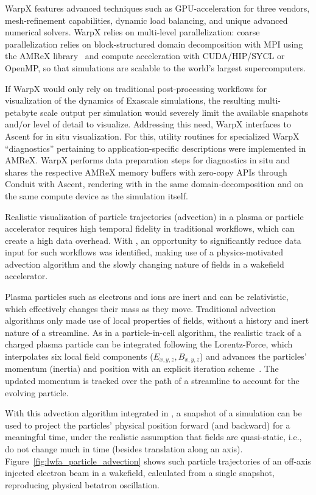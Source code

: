 WarpX features advanced techniques such as GPU-acceleration for three vendors, mesh-refinement capabilities, dynamic load balancing, and unique advanced numerical solvers.
WarpX relies on multi-level parallelization: coarse parallelization relies on block-structured domain decomposition with MPI using the AMReX library~\cite{Zhang2019} and compute acceleration with CUDA/HIP/SYCL or OpenMP, so that simulations are scalable to the world's largest supercomputers.

If WarpX would only rely on traditional post-processing workflows for visualization of the dynamics of Exascale simulations, the resulting multi-petabyte scale output per simulation would severely limit the available snapshots and/or level of detail to visualize.
Addressing this need, WarpX interfaces to Ascent for in situ visualization.
For this, utility routines for specialized WarpX ``diagnostics'' pertaining to application-specific descriptions were implemented in AMReX.
WarpX performs data preparation steps for diagnostics in situ and shares the respective AMReX memory buffers with zero-copy APIs through Conduit with Ascent, rendering with \vtkm in the same domain-decomposition and on the same compute device as the simulation itself.

Realistic visualization of particle trajectories (advection) in a plasma or particle accelerator requires high temporal fidelity in traditional workflows, which can create a high data overhead.
With \vtkm, an opportunity to significantly reduce data input for such workflows was identified, making use of a physics-motivated advection algorithm and the slowly changing nature of fields in a wakefield accelerator.

Plasma particles such as electrons and ions are inert and can be relativistic, which effectively changes their mass as they move.
Traditional advection algorithms only made use of local properties of fields, without a history and inert nature of a streamline.
As in a particle-in-cell algorithm, the realistic track of a charged plasma particle can be integrated following the Lorentz-Force, which interpolates six local field components ($E_{x,y,z}, B_{x,y,z}$) and advances the particles' momentum (inertia) and position with an explicit iteration scheme~\cite{Boris1970}.
The updated momentum is tracked over the path of a streamline to account for the evolving particle.

With this advection algorithm integrated in \vtkm, a snapshot of a simulation can be used to project the particles' physical position forward (and backward) for a meaningful time, under the realistic assumption that fields are quasi-static, i.e., do not change much in time (besides translation along an axis).
Figure~\ref{fig:lwfa_particle_advection} shows such particle trajectories of an off-axis injected electron beam in a wakefield, calculated from a single snapshot, reproducing physical betatron oscillation.


